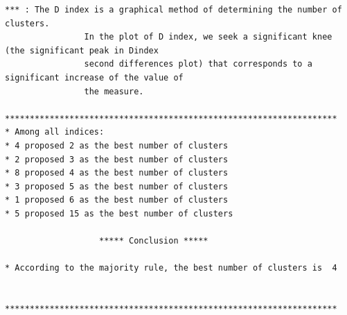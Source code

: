 \documentclass[
]{article}
\begin{document}
\begin{verbatim}
*** : The D index is a graphical method of determining the number of clusters. 
                In the plot of D index, we seek a significant knee (the significant peak in Dindex
                second differences plot) that corresponds to a significant increase of the value of
                the measure. 
 
******************************************************************* 
* Among all indices:                                                
* 4 proposed 2 as the best number of clusters 
* 2 proposed 3 as the best number of clusters 
* 8 proposed 4 as the best number of clusters 
* 3 proposed 5 as the best number of clusters 
* 1 proposed 6 as the best number of clusters 
* 5 proposed 15 as the best number of clusters 

                   ***** Conclusion *****                            
 
* According to the majority rule, the best number of clusters is  4 
 
 
******************************************************************* 
\end{verbatim}
\end{document}
